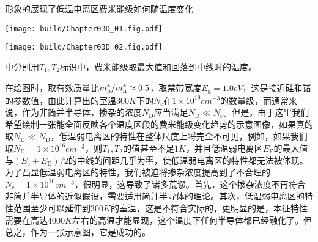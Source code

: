 形象的展现了低温电离区费米能级如何随温度变化
\begin{Figure}[杂质半导体的特性]
    \begin{FigureSub}[杂质半导体的费米能级]
        \texttt{[image: build/Chapter03D\_01.fig.pdf]}
    \end{FigureSub}
    \vspace{0.35cm}
    \begin{FigureSub}[杂质半导体的载流子浓度]
        \texttt{[image: build/Chapter03D\_02.fig.pdf]}
    \end{FigureSub}
\end{Figure}
中分别用$T_1,T_2$标识中，费米能级取最大值和回落到中线时的温度。

在绘图时，取有效质量比$m_\text{p}^{*}/m_\text{n}^{*}\approx 0.5$，取禁带宽度$E_\text{g}=1.0\si{eV}$，这是接近硅和锗的参数值，由此计算出的室温$300\si{K}$下的$N_\text{c}$在$1\times 10^{19}\si{cm^{-3}}$的数量级，而通常来说，作为非简并半导体，掺杂的浓度$N_\text{D}$应当满足$N_\text{D}\ll N_\text{c}$\;。但是，由于这里我们希望绘制一张能全面反映各个温度区段的费米能级变化趋势的示意图像，如果真的取$N_\text{D}\ll N_\text{D}$，低温弱电离区的特性在整体尺度上将完全不可见，例如，如果我们取$N_\text{D}=1\times 10^{16}\si{cm^{-3}}$，则$T_1,T_2$的值甚至不足$1\si{K}$，并且低温弱电离区$E_\text{F}$的最大值与$(E_\text{c}+E_\text{D})/2$的中线的间距几乎为零，使低温弱电离区的特性都无法被体现。为了凸显低温弱电离区的特性，我们被迫将掺杂浓度提高到了不合理的$N_\text{c}=1\times 10^{20}\si{cm^{-3}}$，很明显，这导致了诸多荒谬。首先，这个掺杂浓度不再符合非简并半导体的近似假设，需要适用简并半导体的理论。其次，低温弱电离区的特性范围至少可以延伸到$300\si{K}$的室温，这是不符合实际的，更明显的是，本征特性需要在高达$4000\si{K}$左右的高温才能显现，这个温度下任何半导体都已经融化了。但总之，作为一张示意图，它是成功的。

